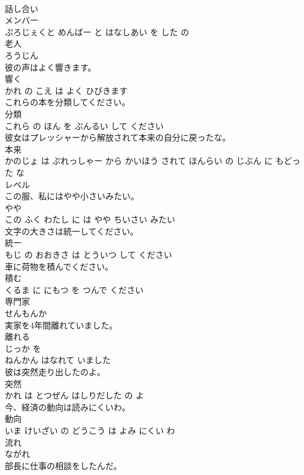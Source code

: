 \documentclass[8pt]{extreport}
\begin{document}
\begin{CJK}{UTF8}{min}
\\	話し合い 
\\	メンバー 
\\	ぷろじぇくと めんばー と はなしあい を した の			
\\	老人	
\\	ろうじん			
\\	彼の声はよく響きます。	
\\	響く 
\\	かれ の こえ は よく ひびきます			
\\	これらの本を分類してください。	
\\	分類 
\\	これら の ほん を ぶんるい して ください			
\\	彼女はプレッシャーから解放されて本来の自分に戻ったな。	
\\	本来 
\\	かのじょ は ぷれっしゃー から かいほう されて ほんらい の じぶん に もどった な			
\\	レベル	
\\	この服、私にはやや小さいみたい。	
\\	やや 
\\	この ふく わたし に は やや ちいさい みたい			
\\	文字の大きさは統一してください。	
\\	統一 
\\	もじ の おおきさ は とういつ して ください			
\\	車に荷物を積んでください。	
\\	積む 
\\	くるま に にもつ を つんで ください			
\\	専門家	
\\	せんもんか			
\\	実家を4年間離れていました。	
\\	離れる 
\\	じっか を 
\\	ねんかん はなれて いました			
\\	彼は突然走り出したのよ。	
\\	突然 
\\	かれ は とつぜん はしりだした の よ			
\\	今、経済の動向は読みにくいわ。	
\\	動向 
\\	いま けいざい の どうこう は よみ にくい わ			
\\	流れ	
\\	ながれ			
\\	部長に仕事の相談をしたんだ。	

\end{CJK}
\end{document}
